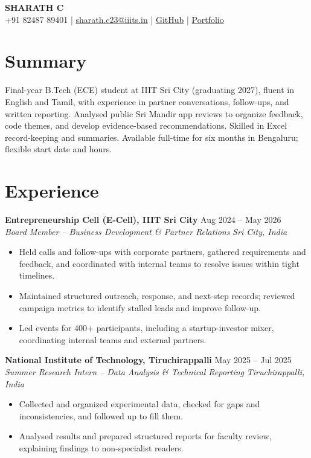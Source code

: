 \documentclass[10pt,a4paper]{article}
\newcommand{\role}[4]{\textbf{#1} \hfill #2\\\textit{#3} \hfill \textit{#4}\vspace{1pt}}
\begin{document}
\begin{center}
{\LARGE\bfseries SHARATH C}\\[3pt]
+91 82487 89401 \;|\; \href{mailto:sharath.c23@iiits.in}{sharath.c23@iiits.in} \;|\;
\href{https://github.com/06SharXD}{GitHub} \;|\;
\href{https://06sharxd.github.io/sharathc-portfolio/}{Portfolio}
\end{center}
\vspace{-7pt}
\section*{Summary}
Final-year B.Tech (ECE) student at IIIT Sri City (graduating 2027), fluent in English and Tamil, with experience in partner conversations, follow-ups, and written reporting. Analysed public Sri Mandir app reviews to organize feedback, code themes, and develop evidence-based recommendations. Skilled in Excel record-keeping and summaries. Available full-time for six months in Bengaluru; flexible start date and hours.
\section*{Experience}
\role{Entrepreneurship Cell (E-Cell), IIIT Sri City}{Aug 2024 -- May 2026}{Board Member -- Business Development \& Partner Relations}{Sri City, India}
\begin{itemize}
  \item Held calls and follow-ups with corporate partners, gathered requirements and feedback, and coordinated with internal teams to resolve issues within tight timelines.
  \item Maintained structured outreach, response, and next-step records; reviewed campaign metrics to identify stalled leads and improve follow-up.
  \item Led events for 400+ participants, including a startup-investor mixer, coordinating internal teams and external partners.
\end{itemize}
\vspace{2pt}
\role{National Institute of Technology, Tiruchirappalli}{May 2025 -- Jul 2025}{Summer Research Intern -- Data Analysis \& Technical Reporting}{Tiruchirappalli, India}
\begin{itemize}
  \item Collected and organized experimental data, checked for gaps and inconsistencies, and followed up to fill them.
  \item Analysed results and prepared structured reports for faculty review, explaining findings to non-specialist readers.
\end{itemize}
\end{document}
